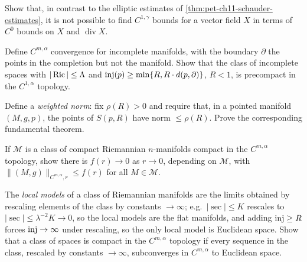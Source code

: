 \begin{remark}[Exercise 11.6.6]
  \label{rem:pet-ch11-exercise-11-6-6}
  Show that, in contrast to the elliptic estimates of
  \cref{thm:pet-ch11-schauder-estimates}, it is not possible to find
  $C^{1,\gamma}$ bounds for a vector field $X$ in terms of $C^0$ bounds on
  $X$ and $\operatorname{div}X$.
\end{remark}

\begin{remark}[Exercise 11.6.7]
  \label{rem:pet-ch11-exercise-11-6-7}
  Define $C^{m,\alpha}$ convergence for incomplete manifolds, with the
  boundary $\partial$ the points in the completion but not the manifold.
  Show that the class of incomplete spaces with $|\operatorname{Ric}|\le\Lambda$ and
  $\operatorname{inj}(p)\ge\min\{R,R\cdot d(p,\partial)\}$, $R<1$, is precompact in the
  $C^{1,\alpha}$ topology.
\end{remark}

\begin{remark}[Exercise 11.6.8]
  \label{rem:pet-ch11-exercise-11-6-8}
  Define a \emph{weighted norm}: fix $\rho(R)>0$ and require that, in a
  pointed manifold $(M,g,p)$, the points of $S(p,R)$ have norm $\le\rho(R)$.
  Prove the corresponding fundamental theorem.
\end{remark}

\begin{remark}[Exercise 11.6.9]
  \label{rem:pet-ch11-exercise-11-6-9}
  If $\mathcal{M}$ is a class of compact Riemannian $n$-manifolds compact in
  the $C^{m,\alpha}$ topology, show there is $f(r)\to0$ as $r\to0$, depending
  on $\mathcal{M}$, with $\|(M,g)\|_{C^{m,\alpha},r}\le f(r)$ for all
  $M\in\mathcal{M}$.
\end{remark}

\begin{remark}[Exercise 11.6.10]
  \label{rem:pet-ch11-exercise-11-6-10}
  The \emph{local models} of a class of Riemannian manifolds are the limits
  obtained by rescaling elements of the class by constants $\to\infty$; e.g.\
  $|\sec|\le K$ rescales to $|\sec|\le\lambda^{-2}K\to0$, so the local models
  are the flat manifolds, and adding $\operatorname{inj}\ge R$ forces $\operatorname{inj}\to\infty$ under
  rescaling, so the only local model is Euclidean space. Show that a class of
  spaces is compact in the $C^{m,\alpha}$ topology if every sequence in the
  class, rescaled by constants $\to\infty$, subconverges in $C^{m,\alpha}$ to
  Euclidean space.
\end{remark}

